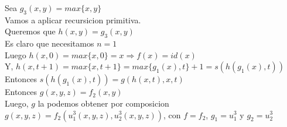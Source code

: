 \documentclass[]{article}
\begin{document}
\begin{flushleft}
	Sea $g_{3}(x,y) = max\lbrace x,y \rbrace$\linebreak
	\\Vamos a aplicar recursicion primitiva. 
	\\Queremos que $h(x,y) = g_{3}(x,y)$
	\\Es claro que necesitamos $n=1$
	\\Luego $h(x,0) = max \lbrace x, 0 \rbrace = x \Rightarrow f(x) = id(x)$
	\\Y, $h(x,t+1) = max \lbrace {x, t+1} \rbrace = max \lbrace g_{1}(x), t \rbrace + 1 = s(h(g_{1}(x),t))$
	\\Entonces 	$s(h(g_{1}(x),t)) = g(h(x,t),x,t)$
	\\Entonces $g(x,y,z) = f_{2}(x,y)$
	\\Luego, $g$ la podemos obtener por composicion $g(x,y,z)=f_{2}(u^{3}_{1}(x,y,z),u^{3}_{2}(x,y,z))$, con $f = f_{2}$, $g_{1} = u^{3}_{1}$ y $g_{2} = u^{3}_{2}$
	
\end{flushleft}
\end{document}

